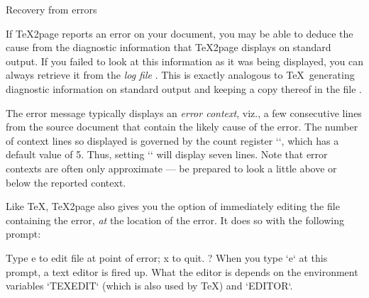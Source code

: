 
 Recovery from errors

%
If \TeX2page reports an error on your document, you may
be able to deduce the cause from the diagnostic
information that \TeX2page displays  on standard
output.  If you failed to look at this information as
it was being displayed, you can always retrieve it from
the {\em log file} .  This is
exactly analogous to \TeX\ generating diagnostic
information on standard output and keeping a copy
thereof in the file .


The  error message typically displays an {\em error
context}, viz., a few consecutive lines from the source
document that contain the likely cause of the error.
The number of context lines so displayed is governed by
the count register `\errorcontextlines`, which has a default
value of 5.  Thus, setting `` will display
seven lines.  Note that error contexts are often
only approximate — be prepared to look a little above
or below the reported context.


Like \TeX, \TeX2page also gives you the option of immediately
editing the file containing the error,
{\em at} the location of the error.  It does so with the
following prompt:

\begintt
Type e to edit file at point of error; x to quit.
?
\endtt
%
When you type `e` at this prompt, a text editor
is fired up.  What the editor is depends on the
environment variables `TEXEDIT` (which is also used
by \TeX) and `EDITOR`.

